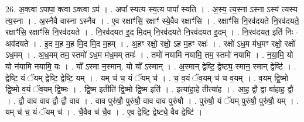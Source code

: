 \documentclass[17pt]{extarticle}
\begin{document}
26. अ॒क्त्वा ऽपापा॒ क्त्वा ऽक्त्वा ऽप॑ । . अपा᳚ स्यत्य स्य॒त्य पापा᳚ स्यति । . अ॒स्य॒ त्य॒स्ना ऽस्ना ऽस्य॑ त्यस्य त्य॒स्ना । . अ॒स्नैवै वास्ना ऽस्नैव । . ए॒व रक्षाꣳ॑सि॒ रक्षाꣳ॑ स्ये॒वैव रक्षाꣳ॑सि । . रक्षाꣳ॑सि नि॒रव॑दयते नि॒रव॑दयते॒ रक्षाꣳ॑सि॒ रक्षाꣳ॑सि नि॒रव॑दयते । . नि॒रव॑दयत इ॒द मि॒दम् नि॒रव॑दयते नि॒रव॑दयत इ॒दम् । . नि॒रव॑दयत॒ इति॑ निः - अव॑दयते । . इ॒द म॒ह म॒ह मि॒द मि॒द म॒हम् । . अ॒हꣳ रक्षो॒ रक्षो॒ ऽह म॒हꣳ रक्षः॑ । . रक्षो॑ ऽध॒म म॑ध॒मꣳ रक्षो॒ रक्षो॑ ऽध॒मम् । . अ॒ध॒मम् तम॒ स्तमो॑ ऽध॒म म॑ध॒मम् तमः॑ । . तमो॑ नयामि नयामि॒ तम॒ स्तमो॑ नयामि । . न॒या॒मि॒ यो यो न॑यामि नयामि॒ यः । . यो᳚ ऽस्मा न॒स्मान्. यो यो᳚ ऽस्मान् । . अ॒स्मान् द्वेष्टि॒ द्वेष्ट्य॒ स्मान॒ स्मान् द्वेष्टि॑ । . द्वेष्टि॒ यं ॅयम् द्वेष्टि॒ द्वेष्टि॒ यम् । . यम् च॑ च॒ यं ॅयम् च॑ । . च॒ व॒यं ॅव॒यम् च॑ च व॒यम् । . व॒यम् द्वि॒ष्मो द्वि॒ष्मो व॒यं ॅव॒यम् द्वि॒ष्मः । . द्वि॒ष्म इतीति॑ द्वि॒ष्मो द्वि॒ष्म इति॑ । . इत्या॑हा॒हे तीत्या॑ह । . आ॒ह॒ द्वौ द्वा वा॑हाह॒ द्वौ । . द्वौ वाव वाव द्वौ द्वौ वाव । . वाव पुरु॑षौ॒ पुरु॑षौ॒ वाव वाव पुरु॑षौ । . पुरु॑षौ॒ यं ॅयम् पुरु॑षौ॒ पुरु॑षौ॒ यम् । . यम् च॑ च॒ यं ॅयम् च॑ । . चै॒वैव च॑ चै॒व । . ए॒व द्वेष्टि॒ द्वेष्ट्ये॒ वैव द्वेष्टि॑ । \newline
\end{document}
